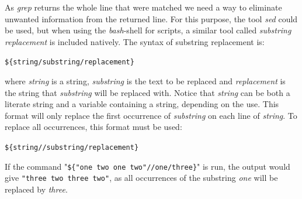 As \textit{grep} returns the whole line that were matched we need a way to eliminate unwanted information from the returned line. For this purpose, the tool \textit{sed} could be used, but when using the \textit{bash}-shell for scripts, a similar tool called \textit{substring replacement} is included natively. The syntax of substring replacement is:

\verb!${string/substring/replacement}!

where \textit{string} is a string, \textit{substring} is the text to be replaced and \textit{replacement} is the string that \textit{substring} will be replaced with. Notice that \textit{string} can be both a literate string and a variable containing a string, depending on the use. This format will only replace the first occurrence of \textit{substring} on each line of \textit{string}. To replace all occurrences, this format must be used:

\verb!${string//substring/replacement}!

If the command "\verb!${"one two one two"//one/three}!" is run, the output would give \verb!"three two three two"!, as all occurrences of the substring \textit{one} will be replaced by \textit{three}.


